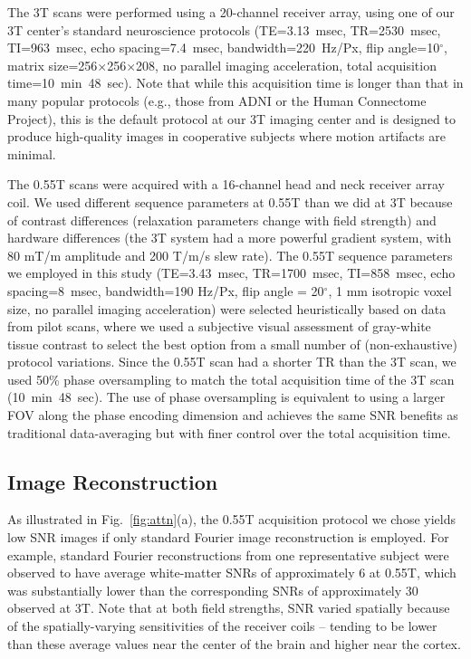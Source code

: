 \documentclass[12pt,letterpaper,onecolumn]{article}
\begin{document}
The 3T scans were performed using a 20-channel receiver array, using one of our 3T center's standard neuroscience protocols  (TE=3.13~msec, TR=2530~msec, TI=963~msec, echo spacing=7.4~msec, bandwidth=220~Hz/Px, flip angle=10$^\circ$, matrix size=256$\times$256$\times$208, no parallel imaging acceleration, total acquisition time=10~min~48~sec). \textcolor{.}{Note that while this acquisition time is longer than that in many popular protocols (e.g., those from ADNI or the Human Connectome Project), this is the default protocol at our 3T imaging center and is designed to produce high-quality images in cooperative subjects where motion artifacts are minimal.}

The 0.55T scans were acquired with a 16-channel head and neck receiver array coil.  We used different sequence parameters at 0.55T than we did at 3T because of contrast differences (relaxation parameters change with field strength) and hardware differences (the 3T system had a more powerful gradient system, with 80 mT/m amplitude and 200 T/m/s slew rate).  The 0.55T sequence parameters we employed in this study (TE=3.43~msec, TR=1700~msec, TI=858~msec, echo spacing=8~msec, bandwidth=190 Hz/Px, flip angle = 20$^\circ$, 1 mm isotropic voxel size, no parallel imaging acceleration) were selected heuristically based on data from pilot scans, where we used a subjective visual assessment of gray-white tissue contrast to select the best option from a small number of (non-exhaustive) protocol variations.    Since the 0.55T scan had a shorter TR than the 3T scan, we used 50\% phase oversampling to match the total acquisition time of the 3T scan (10~min~48~sec).  The use of phase oversampling is equivalent to using a larger FOV along the phase encoding dimension and achieves the same SNR benefits as traditional data-averaging but with finer control over the total acquisition time.  


\subsection{Image Reconstruction}

As illustrated in Fig.~\ref{fig:attn}(a), the 0.55T acquisition protocol we chose yields low SNR images if only standard Fourier image reconstruction is employed. {For example, standard Fourier reconstructions from one representative subject were observed to have average white-matter SNRs of approximately 6 at 0.55T, which was substantially lower than the corresponding SNRs of approximately 30 observed at 3T. Note that at both field strengths, SNR varied spatially because of the spatially-varying sensitivities of the receiver coils -- tending to be lower than these average values near the center of the brain and higher near the cortex.   }
\end{document}
